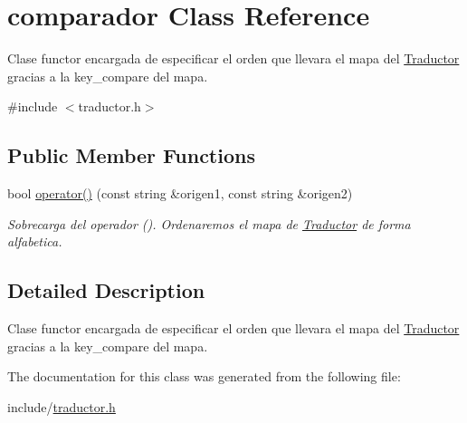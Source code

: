 \hypertarget{classcomparador}{}\section{comparador Class Reference}
\label{classcomparador}


Clase functor encargada de especificar el orden que llevara el mapa del \hyperlink{class_traductor}{Traductor} gracias a la key\+\_\+compare del mapa.  




{\ttfamily \#include $<$traductor.\+h$>$}

\subsection*{Public Member Functions}
\begin{DoxyCompactItemize}
\item 
bool \hyperlink{classcomparador_ab16e1703393f2a3ee6b935ed8abf9a50}{operator()} (const string \&origen1, const string \&origen2)\hypertarget{classcomparador_ab16e1703393f2a3ee6b935ed8abf9a50}{}\label{classcomparador_ab16e1703393f2a3ee6b935ed8abf9a50}

\begin{DoxyCompactList}\small\item\em Sobrecarga del operador (). Ordenaremos el mapa de \hyperlink{class_traductor}{Traductor} de forma alfabetica. \end{DoxyCompactList}\end{DoxyCompactItemize}


\subsection{Detailed Description}
Clase functor encargada de especificar el orden que llevara el mapa del \hyperlink{class_traductor}{Traductor} gracias a la key\+\_\+compare del mapa. 

The documentation for this class was generated from the following file\+:\begin{DoxyCompactItemize}
\item 
include/\hyperlink{traductor_8h}{traductor.\+h}\end{DoxyCompactItemize}
